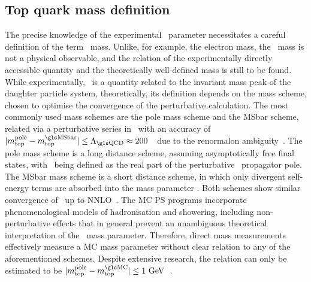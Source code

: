 \subsection{Top quark mass definition}
\label{sect:topdefinition}
%
The precise knowledge of the experimental \mt\ parameter necessitates a careful definition of the term \tquark\ mass. 
%
Unlike, for example, the electron mass, the \tquark\ mass is not a physical observable, and the relation of the experimentally directly accessible quantity and the theoretically well-defined mass is still to be found. 
%
While experimentally, \mt\ is a quantity related to the invariant mass peak of the daughter particle system, theoretically, its definition depends on the mass scheme, chosen to optimise the convergence of the perturbative calculation. The most commonly used mass schemes are the pole mass scheme and the \gls{MSbar} scheme, related via a perturbative series in \alphas\ with an accuracy of $|\mtpole-\mtmsbar|  \leq \LambdaQCD \approx 200$~\MeV\ due to the renormalon ambiguity~\cite{Chetyrkin:1999ys,Melnikov:2000qh}.
%
The pole mass scheme is a long distance scheme, assuming asymptotically free final states, with \mt\ being defined as the real part of the perturbative \tquark\ propagator pole. 
%
%
The \gls{MSbar} mass scheme is a short distance scheme, in which only divergent self-energy terms are absorbed into the mass parameter \mt. 
%
Both schemes show similar convergence of \mt\ up to \gls{NNLO}~\cite{Ahrens:2011px}.
%
The \gls{MC} \gls{PS} programs incorporate phenomenological models of hadronisation and showering, including non-perturbative effects that in general prevent an unambiguous theoretical interpretation of the \tquark\ mass parameter.
%
Therefore, direct mass measurements effectively measure a \gls{MC} mass parameter without clear relation to any of the aforementioned schemes. Despite extensive research, the relation can only be estimated to be $|\mtpole-\mtMC| \leq 1~\GeV$~\cite{Buckley:2011ms,Hoang:2008xm,Agashe:2013hma,Juste:2013dsa,Skands:2007zg}.%












